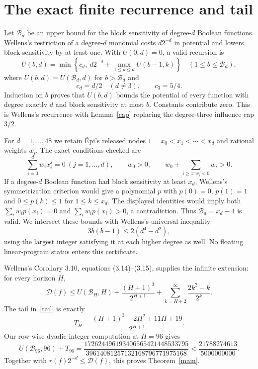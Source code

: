 \documentclass[11pt]{amsart}
\newcommand{\D}{\mathcal D}
\begin{document}
\section{The exact finite recurrence and tail}
Let $\mathcal B_d$ be an upper bound for the block sensitivity of degree-$d$
Boolean functions. Wellens's restriction of a degree-$d$ monomial costs
$d2^{-d}$ in potential and lowers block sensitivity by at least one.
With $U(0,d)=0$, a valid recursion is
\begin{equation}\label{dp}
 U(b,d)=\min\!\left\{c_d,\ d2^{-d}+
                  \max_{1\le k\le d}U(b-1,k)\right\}
 \quad(1\le b\le\mathcal B_d),
\end{equation}
where $U(b,d)=U(\mathcal B_d,d)$ for $b>\mathcal B_d$ and
\[
 c_d=d/2\quad(d\ne3),\qquad c_3=5/4.
\]
Induction on $b$ proves that $U(b,d)$ bounds the potential of every
function with degree exactly $d$ and block sensitivity at most $b$.
Constants contribute zero. This is Wellens's recurrence with
Lemma~\ref{cap} replacing the degree-three influence cap $3/2$.

For $d=1,\ldots,48$ we retain \'Epi's released nodes
$1=x_0<x_1<\cdots<x_d$ and rational weights $w_i$.
The exact conditions checked are
\[
 \sum_{i=0}^d w_i x_i^j=0\ (j=1,\ldots,d),\qquad
 w_0>0,\qquad w_0+\sum_{i\ge1:w_i<0}w_i>0.
\]
If a degree-$d$ Boolean function had block sensitivity at least $x_d$,
Wellens's symmetrization criterion would give a polynomial $p$ with
$p(0)=0$, $p(1)=1$ and $0\le p(k)\le1$ for $1\le k\le x_d$.
The displayed identities would imply both $\sum_iw_i p(x_i)=0$ and
$\sum_iw_i p(x_i)>0$, a contradiction. Thus
$\mathcal B_d=x_d-1$ is valid. We intersect these bounds with Wellens's
universal inequality
\[
 3b(b-1)\le2(d^4-d^2),
\]
using the largest integer satisfying it at each higher degree as well.
No floating linear-program status enters this certificate.

Wellens's Corollary 3.10, equations (3.14)--(3.15), supplies the infinite
extension: for every horizon $H$,
\begin{equation}\label{tail}
 \D(f)\le U(\mathcal B_H,H)
       +\frac{(H+1)^3}{2^{H+1}}
       +\sum_{k=H+2}^\infty\frac{2k^2-k}{2^k}.
\end{equation}
The tail in~\eqref{tail} is exactly
\[
 T_H=\frac{(H+1)^3+2H^2+11H+19}{2^{H+1}}.
\]
Our row-wise dyadic-integer computation at $H=96$ gives
\[
 U(\mathcal B_{96},96)+T_{96}
 =\frac{172624496193406565421448533795}
       {39614081257132168796771975168}
 <\frac{21788274613}{5000000000}.
\]
Together with $r(f)2^{-d}\le\D(f)$, this proves Theorem~\ref{main}.
\end{document}
